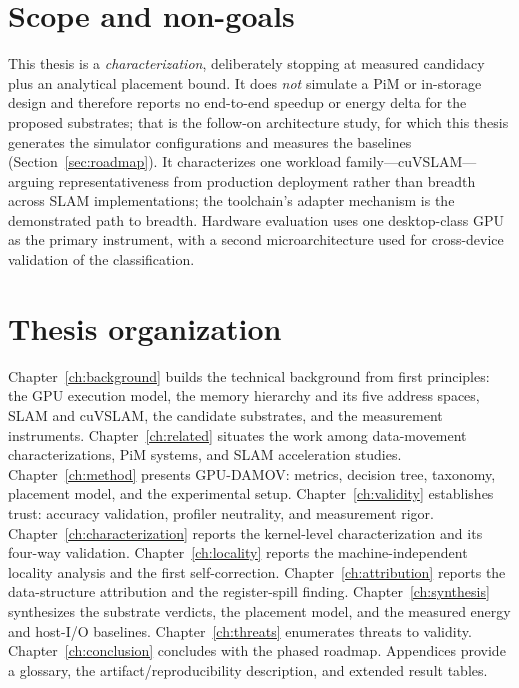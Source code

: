 \section{Scope and non-goals}

This thesis is a \emph{characterization}, deliberately stopping at measured
candidacy plus an analytical placement bound. It does \emph{not} simulate a
PiM or in-storage design and therefore reports no end-to-end speedup or
energy delta for the proposed substrates; that is the follow-on architecture
study, for which this thesis generates the simulator configurations and
measures the baselines (Section~\ref{sec:roadmap}). It characterizes one
workload family---cuVSLAM---arguing representativeness from production
deployment rather than breadth across SLAM implementations; the toolchain's
adapter mechanism is the demonstrated path to breadth. Hardware evaluation
uses one desktop-class GPU as the primary instrument, with a second
microarchitecture used for cross-device validation of the classification.

\section{Thesis organization}

Chapter~\ref{ch:background} builds the technical background from first
principles: the GPU execution model, the memory hierarchy and its five
address spaces, SLAM and cuVSLAM, the candidate substrates, and the
measurement instruments. Chapter~\ref{ch:related} situates the work among
data-movement characterizations, PiM systems, and SLAM acceleration studies.
Chapter~\ref{ch:method} presents GPU-DAMOV: metrics, decision tree,
taxonomy, placement model, and the experimental setup.
Chapter~\ref{ch:validity} establishes trust: accuracy validation, profiler
neutrality, and measurement rigor. Chapter~\ref{ch:characterization} reports
the kernel-level characterization and its four-way validation.
Chapter~\ref{ch:locality} reports the machine-independent locality analysis
and the first self-correction. Chapter~\ref{ch:attribution} reports the
data-structure attribution and the register-spill finding.
Chapter~\ref{ch:synthesis} synthesizes the substrate verdicts, the placement
model, and the measured energy and host-I/O baselines.
Chapter~\ref{ch:threats} enumerates threats to validity.
Chapter~\ref{ch:conclusion} concludes with the phased roadmap. Appendices
provide a glossary, the artifact/reproducibility description, and extended
result tables.
